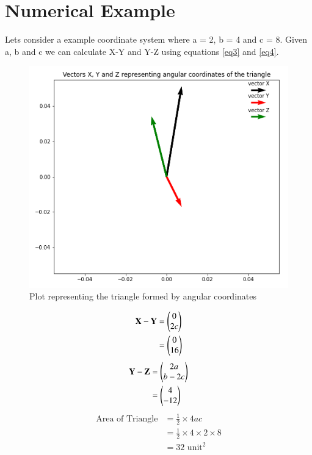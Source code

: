 \documentclass[journal,12pt]{IEEEtran}
\begin{document}
\section{Numerical Example}
Lets consider a example coordinate system where a = 2, b = 4 and c = 8. Given a, b and c we can calculate X-Y and Y-Z using equations \ref{eq3} and \ref{eq4}.\\
\begin{figure}[h]
	\centering
	\includegraphics[width=\columnwidth]{Vectors_Fig.png}
	\caption{Plot representing the triangle formed by angular coordinates}
	\label{fig1}
\end{figure}
\begin{align}
\begin{split}
\mathbf{X-Y} & = \begin{pmatrix}0\\2c\end{pmatrix} \\
& = \begin{pmatrix}0\\16\end{pmatrix}
\end{split}
\label{eq7}
\end{align}
\begin{align}
\begin{split}
\mathbf{Y-Z} & = \begin{pmatrix}2a\\b-2c\end{pmatrix} \\
& = \begin{pmatrix}4\\-12\end{pmatrix}
\end{split}
\label{eq8}
\end{align}
\begin{align}
\text{Area of Triangle} & = \frac{1}{2} \times 4ac \\
& = \frac{1}{2} \times 4 \times 2 \times 8 \\
& = 32 \text{ unit}^2
\label{eq9}
\end{align}
\end{document}
